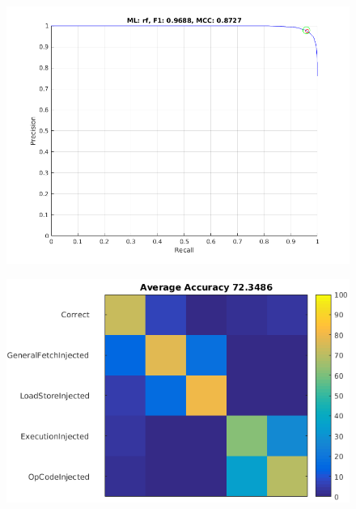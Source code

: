 \documentclass{sig-alternate}
\begin{document}
\begin{figure}[t]
\begin{center}
   \includegraphics[width=0.95\linewidth]{./figures/siaf.png}
\end{center}
   \caption{}
\label{fig:siaf}
\end{figure}

\begin{figure}[t]
\begin{center}
   \includegraphics[width=0.95\linewidth]{./figures/siaf_multi.png}
\end{center}
   \caption{}
\label{fig:siaf-multi}
\end{figure}
\end{document}
